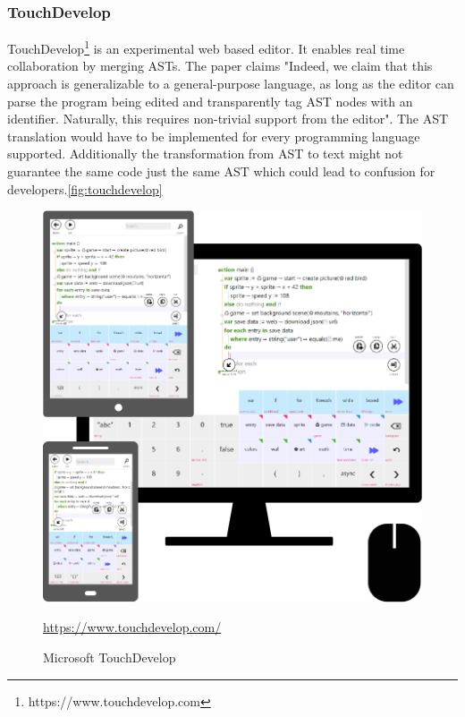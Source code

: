 \subsubsection{TouchDevelop}
TouchDevelop\footnote{https://www.touchdevelop.com} is an experimental web based editor. It enables real time collaboration by merging ASTs. The paper claims "Indeed, we claim that this approach is generalizable to a
general-purpose language, as long as the editor can parse the
program being edited and transparently tag AST nodes with
an identifier. Naturally, this requires non-trivial support from
the editor".\cite{ProtzenkoBurckhardtMoskalMcClurg:2015:Implementingreal-timecollaborationinTouchDevelopusingASTmerges} The AST translation would have to be implemented for every programming language supported. Additionally the transformation from AST to text might not guarantee the same code just the same AST which could lead to confusion for developers.\autoref{fig:touchdevelop}
\begin{figure}[hb]
    \centering
    \includegraphics{figures/screenshots/touchdevelop.png}
	\caption{Microsoft TouchDevelop }
	\href{https://www.touchdevelop.com/}{https://www.touchdevelop.com/}
    \label{fig:touchdevelop}
\end{figure}

